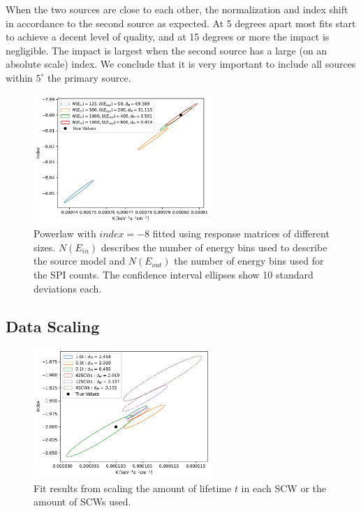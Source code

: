 \documentclass{report}
\begin{document}
When the two sources are close to each other, the normalization and index shift in accordance to the second source as expected. At 5 degrees apart most fits start to achieve a decent level of quality, and at 15 degrees or more the impact is negligible. The impact is largest when the second source has a large (on an absolute scale) index. We conclude that it is very important to include all sources within $5^\circ$ the primary source.

\FloatBarrier

\begin{figure}[h]
  \centering
  \includegraphics[width=0.6\textwidth]{Images/Pure_Simulation/large_index_combined_plot_10sig.pdf}
  \caption{Powerlaw with $index=-8$ fitted using response matrices of different sizes. $N(E_{in})$ describes the number of energy bins used to describe the source model and $N(E_{out})$ the number of energy bins used for the SPI counts. The confidence interval ellipses show 10 standard deviations each.}
  \label{fig large index}
\end{figure}

\subsection{Data Scaling}



\begin{figure}[H]
  \centering
  \includegraphics[width=0.6\textwidth]{Images/Pure_Simulation/combined_plots_data_scaling.pdf}
  \caption{Fit results from scaling the amount of lifetime $t$ in each SCW or the amount of SCWs used.}
  \label{fig data scaling}
\end{figure}
\end{document}
